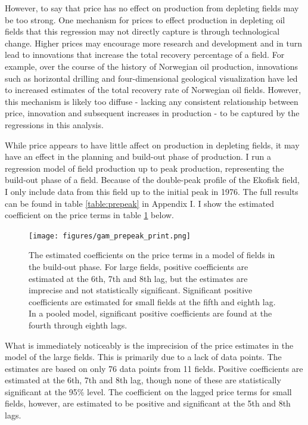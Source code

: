 \documentclass[11pt]{article}
\begin{document}
However, to say that price has no effect on production from depleting fields may be too strong. One mechanism for prices to effect production in depleting oil fields that this regression may not directly capture is through technological change.  Higher prices may encourage more research and development and in turn lead to innovations that increase the total recovery percentage of a field.  For example, over the course of the history of Norwegian oil production, innovations such as horizontal drilling and four-dimensional geological visualization have led to increased estimates of the total recovery rate of Norwegian oil fields.  However, this mechanism is likely too diffuse - lacking any consistent relationship between price, innovation and subsequent increases in production - to be captured by the regressions in this analysis. 

While price appears to have little affect on production in depleting fields, it may have an effect in the planning and build-out phase of production. I run a regression model of field production up to peak production, representing the build-out phase of a field.  Because of the double-peak profile of the Ekofisk field, I only include data from this field up to the initial peak in 1976.  The full results can be found in table \ref{table:prepeak} in Appendix I.  I show the estimated coefficient on the price terms in table \ref{gam_prepeak_print} below.  

\begin{figure}
	\texttt{[image: figures/gam\_prepeak\_print.png]}
	\caption{The estimated coefficients on the price terms in a model of fields in the build-out phase.  For large fields, positive coefficients are estimated at the 6th, 7th and 8th lag, but the estimates are imprecise and not statistically significant.  Significant positive coefficients are estimated for small fields at the fifth and eighth lag.  In a pooled model, significant positive coefficients are found at the fourth through eighth lags.}
	\label{gam_prepeak_print}
\end{figure}

What is immediately noticeably is the imprecision of the price estimates in the model of the large fields.  This is primarily due to a lack of data points.  The estimates are based on only 76 data points from 11 fields.  Positive coefficients are estimated at the 6th, 7th and 8th lag, though none of these are statistically significant at the 95\% level.  The coefficient on the lagged price terms for small fields, however, are estimated to be positive and significant at the 5th and 8th lags.  
\end{document}
